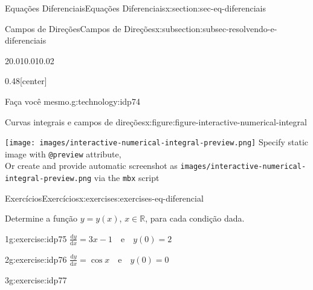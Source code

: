 \documentclass[oneside,10pt,]{article}
\newcommand{\mono}[1]{\texttt{#1}}
\numberwithin{equation}{section}
\newlength{\qrsize}
\newlength{\previewwidth}
\newcommand{\dd}{\mathrm{d}}
\begin{document}
\begin{sectionptx}{Equações Diferenciais}{}{Equações Diferenciais}{}{}{x:section:sec-eq-diferenciais}
\begin{subsectionptx}{Campos de Direções}{}{Campos de Direções}{}{}{x:subsection:subsec-resolvendo-e-diferenciais}
\begin{sidebyside}{2}{0.01}{0.01}{0.02}
\begin{sbspanel}{0.48}[center]
\end{sbspanel}%
\end{sidebyside}%
\begin{technology}{Faça você mesmo.}{g:technology:idp74}%
\begin{figureptx}{Curvas integrais e campos de direções}{x:figure:figure-interactive-numerical-integral}{}%
\centering
\setlength{\qrsize}{9em}
\setlength{\previewwidth}{\linewidth}
\addtolength{\previewwidth}{-\qrsize}
\begin{tcbraster}[raster columns=2, raster column skip=1pt, raster halign=center, raster force size=false, raster left skip=0pt, raster right skip=0pt]%
\begin{tcolorbox}[previewstyle, width=\previewwidth]%
%
{\texttt{[image: images/interactive-numerical-integral-preview.png]}}%
{\small{}Specify static image with \mono{@preview} attribute,\\Or create and provide automatic screenshot as \mono{images/interactive-numerical-integral-preview.png} via the \mono{mbx} script}%
\end{tcolorbox}%
\begin{tcolorbox}[qrstyle]%
{\hypersetup{urlcolor=black}}%
\end{tcolorbox}%
\end{tcbraster}%
\tcblower
\end{figureptx}%
\end{technology}
\end{subsectionptx}
%
%
\typeout{************************************************}
\typeout{************************************************}
%
\begin{exercises-subsection}{Exercícios}{}{Exercícios}{}{}{x:exercises:exercises-eq-diferencial}
\par\medskip\noindent%
%
Determine a função \(y=y(x)\), \(x\in\mathbb{R}\), para cada condição dada.%
\begin{exercisegroup}
\begin{divisionexerciseeg}{1}{}{}{g:exercise:idp75}%
\(\frac{\dd y}{\dd x}=3x-1\quad \text{e} \quad y(0)=2\)\end{divisionexerciseeg}%
\begin{divisionexerciseeg}{2}{}{}{g:exercise:idp76}%
\(\frac{\dd y}{\dd x}=\cos{x} \quad \text{e} \quad y(0)=0\)\end{divisionexerciseeg}%
\begin{divisionexerciseeg}{3}{}{}{g:exercise:idp77}%

\end{divisionexerciseeg}
\end{exercisegroup}
\end{exercises-subsection}
\end{sectionptx}
\end{document}
